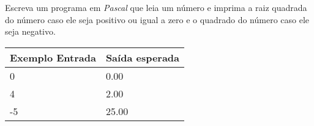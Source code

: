 \item Escreva um programa em \emph{Pascal} que leia um número e imprima a raiz quadrada do número caso ele seja positivo ou igual a zero e o quadrado 
do número caso ele seja negativo.

\begin{center}
\begin{tabular}{|l|l|} \hline
Exemplo Entrada & Saída esperada \\ \hline
0                & 0.00               \\ \hline
4                & 2.00               \\ \hline
-5               & 25.00               \\ \hline
\end{tabular}
\end{center}